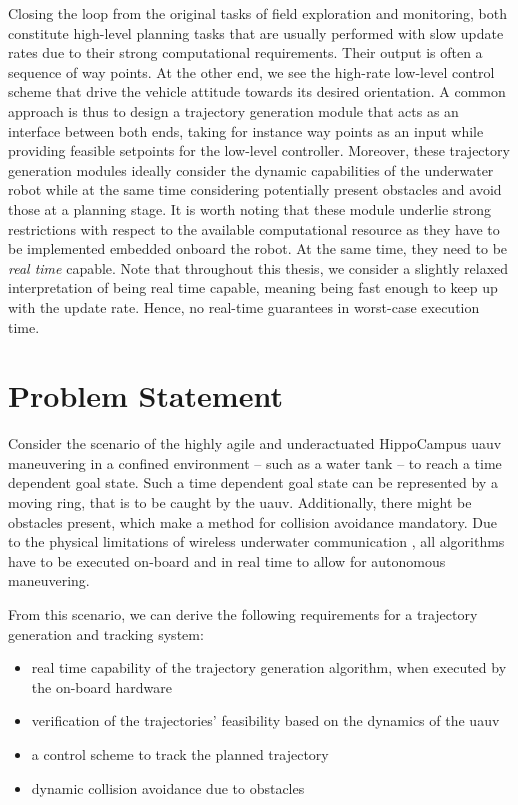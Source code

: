 Closing the loop from the original tasks of field exploration and monitoring, both constitute high-level planning tasks that are usually performed with slow update rates due to their strong computational requirements.
Their output is often a sequence of way points.
At the other end, we see the high-rate low-level control scheme that drive the vehicle attitude towards its desired orientation.
A common approach is thus to design a trajectory generation module that acts as an interface between both ends, taking for instance way points as an input while providing feasible setpoints for the low-level controller. 
Moreover, these trajectory generation modules ideally consider the dynamic capabilities of the underwater robot while at the same time considering potentially present obstacles and avoid those at a planning stage.
It is worth noting that these module underlie strong restrictions with respect to the available computational resource as they have to be implemented embedded onboard the robot.
At the same time, they need to be \textit{real time} capable. 
Note that throughout this thesis, we consider a slightly relaxed interpretation of being real time  capable, meaning being fast enough to keep up with the update rate. 
Hence, no real-time guarantees in worst-case execution time.












\section{Problem Statement}
Consider the scenario of the highly agile and underactuated HippoCampus \ac{uauv} maneuvering in a confined environment -- such as a water tank -- to reach a time dependent goal state.
Such a time dependent goal state can be represented by a moving ring, that is to be caught by the \ac{uauv}.
Additionally, there might be obstacles present, which make a method for collision avoidance mandatory.
Due to the physical limitations of wireless underwater communication \cite{Bettale08p1,GeistEtAl16}, all algorithms have to be executed on-board and in real time to allow for autonomous maneuvering.

From this scenario, we can derive the following requirements for a trajectory generation and tracking system:

\begin{itemize}
    \item real time capability of the trajectory generation algorithm, when executed by the on-board hardware
    \item verification of the trajectories' feasibility based on the dynamics of the \ac{uauv}
    \item a control scheme to track the planned trajectory
    \item dynamic collision avoidance due to obstacles
\end{itemize}

